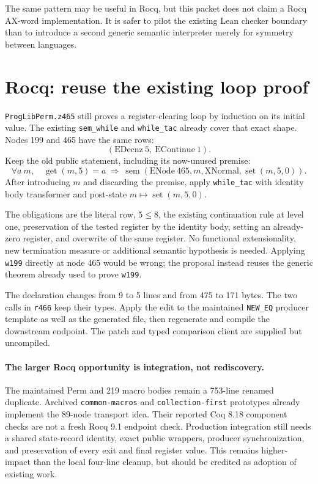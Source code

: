 \documentclass[11pt]{article}
\begin{document}
The same pattern may be useful in Rocq, but this packet does not claim a Rocq AX-word implementation. It is safer to pilot the existing Lean checker boundary than to introduce a second generic semantic interpreter merely for symmetry between languages.

\section{Rocq: reuse the existing loop proof}\label{sec:rocq}
\texttt{ProgLibPerm.z465} still proves a register-clearing loop by induction on its initial value. The existing \texttt{sem\_while} and \texttt{while\_tac} already cover that exact shape. Nodes 199 and 465 have the same rows:
\[
(\mathrm{EDecnz}\ 5,\ \mathrm{EContinue}\ 1).
\]
Keep the old public statement, including its now-unused premise:
\[
\forall a\ m,\quad \operatorname{get}(m,5)=a\ \Longrightarrow\
\operatorname{sem}(\mathrm{ENode}\ 465,m,\mathrm{XNormal},\operatorname{set}(m,5,0)).
\]
After introducing $m$ and discarding the premise, apply \texttt{while\_tac} with identity body transformer and post-state $m\mapsto\operatorname{set}(m,5,0)$.

The obligations are the literal row, $5\le8$, the existing continuation rule at level one, preservation of the tested register by the identity body, setting an already-zero register, and overwrite of the same register. No functional extensionality, new termination measure or additional semantic hypothesis is needed. Applying \texttt{w199} directly at node 465 would be wrong; the proposal instead reuses the generic theorem already used to prove \texttt{w199}.

The declaration changes from 9 to 5 lines and from 475 to 171 bytes. The two calls in \texttt{r466} keep their types. Apply the edit to the maintained \texttt{NEW\_EQ} producer template as well as the generated file, then regenerate and compile the downstream endpoint. The patch and typed comparison client are supplied but uncompiled.

\paragraph{The larger Rocq opportunity is integration, not rediscovery.}
The maintained Perm and 219 macro bodies remain a 753-line renamed duplicate. Archived \texttt{common-macros} and \texttt{collection-first} prototypes already implement the 89-node transport idea. Their reported Coq 8.18 component checks are not a fresh Rocq 9.1 endpoint check. Production integration still needs a shared state-record identity, exact public wrappers, producer synchronization, and preservation of every exit and final register value. This remains higher-impact than the local four-line cleanup, but should be credited as adoption of existing work.
\end{document}
